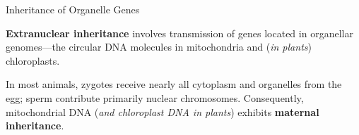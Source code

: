 \documentclass[10pt]{article}
\begin{document}
    \begin{core}{Inheritance of Organelle Genes}

      \textbf{Extranuclear inheritance} involves transmission of genes located in organellar genomes---the circular DNA molecules in mitochondria and (\textit{in plants}) chloroplasts.

      In most animals, zygotes receive nearly all cytoplasm and organelles from the egg; sperm contribute primarily nuclear chromosomes. Consequently, mitochondrial DNA (\textit{and chloroplast DNA in plants}) exhibits \textbf{maternal inheritance}.

    \end{core}
\end{document}
